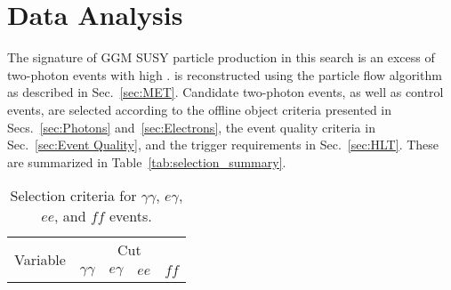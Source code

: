 \documentclass[dissertation.tex]{subfiles}
\begin{document}
\chapter{Data Analysis}
\label{chap:Data Analysis}

The signature of GGM SUSY particle production in this search is an excess of two-photon events with high \MET.  \MET is reconstructed using the particle flow algorithm as described in Sec.~\ref{sec:MET}.  Candidate two-photon events, as well as control events, are selected according to the offline object criteria presented in Secs.~\ref{sec:Photons} and~\ref{sec:Electrons}, the event quality criteria in Sec.~\ref{sec:Event Quality}, and the trigger requirements in Sec.~\ref{sec:HLT}.  These are summarized in Table~\ref{tab:selection_summary}.

\begin{table}[hcbp]
\caption{Selection criteria for $\gamma\gamma$, $e\gamma$, $ee$, and $\mathit{ff}$ events.}
\centering
\begin{tabular}{|c|c|c|c|c|}
\hline
\multirow{2}{*}{Variable} & \multicolumn{4}{c|}{Cut} \\
\cline{2-5}
& $\gamma\gamma$ & $e\gamma$ & $ee$ & $\mathit{ff}$ \\
\hline
\hline

\end{tabular}
\end{table}
\end{document}
